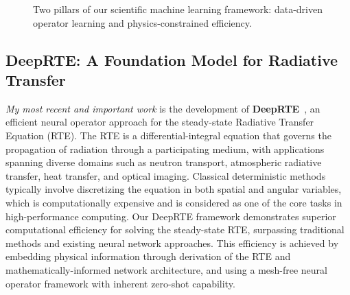 \begin{figure}[H]
  \centering
  \vspace{-0.5em}
  \caption{Two pillars of our scientific machine learning framework: data-driven operator learning and physics-constrained efficiency.}
\end{figure}

\subsection{DeepRTE: A Foundation Model for Radiative Transfer}

\emph{My most recent and important work} is the development of
\textbf{DeepRTE}~\cite{DeepRTE2026}, an efficient neural operator approach
for the steady-state Radiative Transfer Equation (RTE). The RTE is a diﬀerential-integral
equation that governs the propagation of radiation through a participating
medium, with applications spanning diverse domains such as neutron transport,
atmospheric radiative transfer, heat transfer, and optical imaging.
Classical deterministic methods typically involve discretizing the equation
in both spatial and angular variables, which is computationally expensive and
is considered as one of the core tasks in high-performance computing.
Our DeepRTE framework demonstrates superior computational eﬃciency for solving
the steady-state RTE, surpassing traditional methods and existing neural
network approaches. This eﬃciency is achieved by embedding physical
information through derivation of the RTE and mathematically-informed network
architecture, and using a mesh-free neural operator framework with inherent
zero-shot capability.

